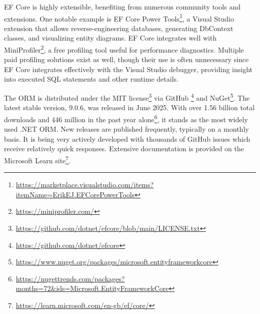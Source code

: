 EF Core is highly extensible, benefiting from numerous community tools and extensions. One notable example is EF Core Power Tools\footnote{\url{https://marketplace.visualstudio.com/items?itemName=ErikEJ.EFCorePowerTools}}, a Visual Studio extension that allows reverse-engineering databases, generating DbContext classes, and visualizing entity diagrams. EF Core integrates well with MiniProfiler\footnote{\url{https://miniprofiler.com/}}, a free profiling tool useful for performance diagnostics. Multiple paid profiling solutions exist as well, though their use is often unnecessary since EF Core integrates effectively with the Visual Studio debugger, providing insight into executed SQL statements and other runtime details.


The ORM is distributed under the MIT license\footnote{\url{https://github.com/dotnet/efcore/blob/main/LICENSE.txt}} via GitHub \footnote{\url{https://github.com/dotnet/efcore}} and NuGet\footnote{\url{https://www.nuget.org/packages/microsoft.entityframeworkcore}}. The latest stable version, 9.0.6, was released in June 2025. With over 1.56 billion total downloads and 446 million in the past year alone\footnote{\url{https://nugettrends.com/packages?months=72&ids=Microsoft.EntityFrameworkCore}}, it stands as the most widely used .NET ORM. New releases are published frequently, typically on a monthly basis. It is being very actively developed with thousands of GitHub issues which receive relatively quick responses. Extensive documentation is provided on the Microsoft Learn site\footnote{\url{https://learn.microsoft.com/en-gb/ef/core/}}.

